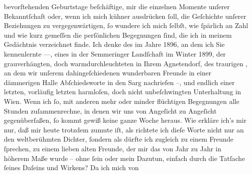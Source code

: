 {\begin{ledgroupsized}[t]{13cm}
               bevorſtehenden Geburtstage beſchäftige, mir die einzelnen Momente unſerer
               Bekanntſchaft oder, wenn ich mich kühner ausdrücken ſoll, die Geſchichte unſerer
               Beziehungen zu vergegenwärtigen, ſo wundere ich mich ſelbſt, wie ſpärlich an Zahl und
               wie kurz gemeſſen die perſönlichen Begegnungen ſind, die ich in meinem Gedächtnis
               verzeichnet finde. Ich denke des \label{K_L02377_2v}\label{K_L02377_2h} im Jahre 1896, an dem ich Sie kennenlernte —, eines \label{K_L02377_3v}\label{K_L02377_3h} in der Semmeringer Landſchaft im
                  Winter 1899, der grauverhängten, doch warmdurchleuchteten \label{K_L02377_4v}\label{K_L02377_4h} in Ihrem Agnetendorf, des traurigen \label{K_L02377_5v}\label{K_L02377_5h}, an dem wir unſerem dahingeſchiedenen wunderbaren Freunde in einer dämmerigen Halle
               Abſchiedsworte in den Sarg nachriefen –, und endlich einer letzten, vorläufig letzten
               harmloſen, doch nicht unbeſchwingten Unterhaltung in Wien. Wenn ich ſo, mit anderen mehr oder minder flüchtigen Begegnungen alle
               Stunden zuſammenrechne, in denen wir uns von Angeſicht zu Angeſicht gegenüberſaßen,
               ſo kommt gewiß keine ganze Woche heraus. Wie erkläre ich’s mir nur, daß mir heute
               trotzdem zumute iſt, als richtete ich dieſe Worte nicht nur an den weltberühmten
               Dichter, ſondern als dürfte ich zugleich zu einem Freunde ſprechen, zu einem lieben
               alten Freunde, der mir das von Jahr zu Jahr in höherem Maße wurde – ohne ſein oder
               mein Dazutun, einfach durch die Tatſache ſeines Daſeins und Wirkens? Da ich mich von

\end{ledgroupsized}}
